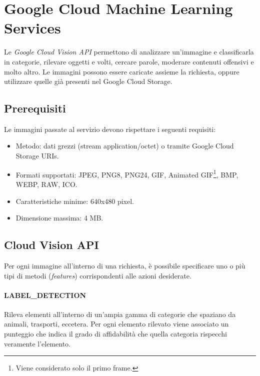 %
\section{Google Cloud Machine Learning Services}
Le \textit{Google Cloud Vision API} \cite{google-api} permettono di analizzare un'immagine e classificarla in categorie, rilevare oggetti e volti, cercare parole,
moderare contenuti offensivi e molto altro. Le immagini possono essere caricate assieme la richiesta, oppure utilizzare quelle già presenti nel Google Cloud Storage.
%
\subsection{Prerequisiti}
Le immagini passate al servizio devono rispettare i seguenti requisiti:
\begin{itemize}
\item Metodo: dati grezzi (stream application/octet) o tramite Google Cloud Storage URIs.
\item Formati supportati: JPEG, PNG8, PNG24, GIF, Animated GIF\footnote{Viene considerato solo il primo frame.},
BMP, WEBP, RAW, ICO.
\item Caratteristiche minime: 640x480 pixel.
\item Dimensione massima: 4 MB.
\end{itemize}
\subsection{Cloud Vision API}
Per ogni immagine all'interno di una richiesta, è possibile specificare uno o più tipi di metodi (\textit{features}) corrispondenti alle azioni desiderate.
\paragraph{\textsf{LABEL\_DETECTION}} Rileva elementi all'interno di un'ampia gamma di categorie che spaziano da animali, trasporti, eccetera.
Per ogni elemento rilevato viene associato un punteggio che indica il grado di affidabilità che quella categoria rispecchi veramente l'elemento.
%
